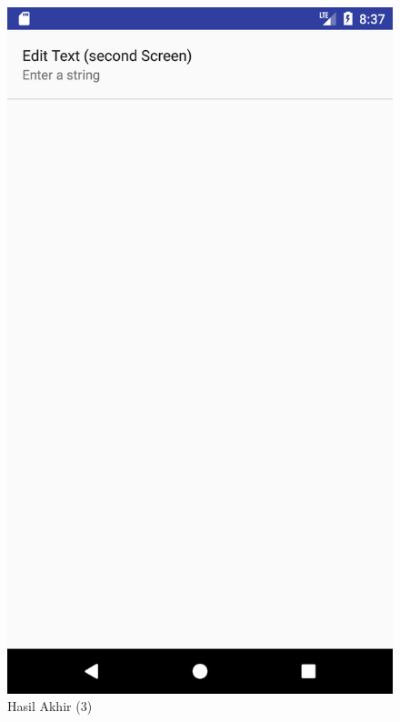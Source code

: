 \documentclass{scrartcl}
\begin{document}
\begin{enumerate}
		\begin{figure}[htbp]
			\begin{minipage}{.5\textwidth}
				\centering
				\includegraphics[width=0.7\linewidth]{Screenshot_1497490697}
				\caption{Hasil Akhir (3)}
				\label{fig:screenshot_1497490697}
			\end{minipage}%
			\begin{minipage}{.5\textwidth}
				\centering

\end{minipage}
\end{figure}
\end{enumerate}
\end{document}

